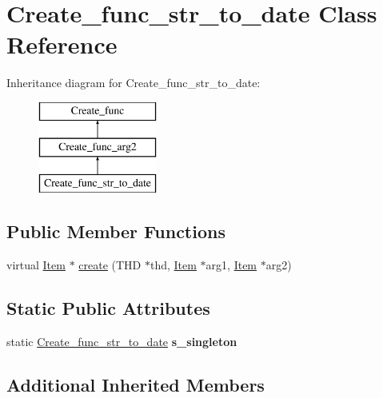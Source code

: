 \hypertarget{classCreate__func__str__to__date}{}\section{Create\+\_\+func\+\_\+str\+\_\+to\+\_\+date Class Reference}
\label{classCreate__func__str__to__date}
Inheritance diagram for Create\+\_\+func\+\_\+str\+\_\+to\+\_\+date\+:\begin{figure}[H]
\begin{center}
\leavevmode
\includegraphics[height=3.000000cm]{classCreate__func__str__to__date}
\end{center}
\end{figure}
\subsection*{Public Member Functions}
\begin{DoxyCompactItemize}
\item 
virtual \mbox{\hyperlink{classItem}{Item}} $\ast$ \mbox{\hyperlink{classCreate__func__str__to__date_a547c8efe41c9772c89638481443e919c}{create}} (T\+HD $\ast$thd, \mbox{\hyperlink{classItem}{Item}} $\ast$arg1, \mbox{\hyperlink{classItem}{Item}} $\ast$arg2)
\end{DoxyCompactItemize}
\subsection*{Static Public Attributes}
\begin{DoxyCompactItemize}
\item 
\mbox{\label{classCreate__func__str__to__date_a93b920681c612831f1d7fab2721968bc}} 
static \mbox{\hyperlink{classCreate__func__str__to__date}{Create\+\_\+func\+\_\+str\+\_\+to\+\_\+date}} {\bfseries s\+\_\+singleton}
\end{DoxyCompactItemize}
\subsection*{Additional Inherited Members}


